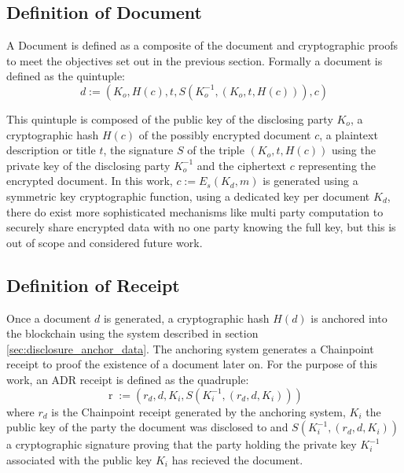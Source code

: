 \documentclass[12pt,msc,a4paper,oneside]{ucl_thesis}
\DeclareMathOperator{\adrreceipt}{r}
\begin{document}
\subsection{Definition of Document} \label{sec:definition_of_document}
A Document is defined as a composite of the document and cryptographic proofs to meet the objectives set out in the previous section. Formally a document is defined as the quintuple:
\begin{equation}
    d := (K_o, H(c), t, S(K_o^{-1}, (K_o, t, H(c))), c)
    \label{eq:disclosure_document}
\end{equation}

This quintuple is composed of the public key of the disclosing party $K_o$, a cryptographic hash $H(c)$ of the possibly encrypted document $c$, a plaintext description or title $t$, the signature $S$ of the triple $(K_o, t, H(c))$ using the private key of the disclosing party $K_o^{-1}$ and the ciphertext $c$ representing the encrypted document. In this work, $c := E_s(K_d, m)$ is generated using a symmetric key cryptographic function, using a dedicated key per document $K_d$, there do exist more sophisticated mechanisms like multi party computation to securely share encrypted data with no one party knowing the full key, but this is out of scope and considered future work.

\subsection{Definition of Receipt} \label{sec:definition_of_receipt}
Once a document $d$ is generated, a cryptographic hash $H(d)$ is anchored into the blockchain using the system described in section \ref{sec:disclosure_anchor_data}. The anchoring system generates a Chainpoint receipt to proof the existence of a document later on. For the purpose of this work, an ADR receipt is defined as the quadruple:
\begin{equation}
    \adrreceipt := (r_d, d, K_i, S(K_i^{-1}, (r_d, d, K_i)))
    \label{eq:disclosure_receipt}
\end{equation}
where $r_d$ is the Chainpoint receipt generated by the anchoring system, $K_i$ the public key of the party the document was disclosed to and $S(K_i^{-1}, (r_d, d, K_i))$ a cryptographic signature proving that the party holding the private key $K_i^{-1}$ associated with the public key $K_i$ has recieved the document.
\end{document}
